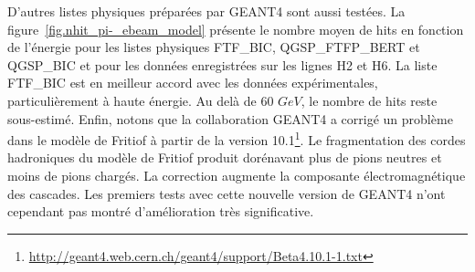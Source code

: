 D'autres listes physiques préparées par GEANT4 sont aussi testées. La figure~\ref{fig.nhit_pi-_ebeam_model} présente le nombre moyen de hits en fonction de l'énergie pour les listes physiques FTF\_BIC, QGSP\_FTFP\_BERT et QGSP\_BIC et pour les données enregistrées sur les lignes H2 et H6. La liste FTF\_BIC est en meilleur accord avec les données expérimentales, particulièrement à haute énergie. Au delà de 60 $GeV$, le nombre de hits reste sous-estimé. Enfin, notons que la collaboration GEANT4 a corrigé un problème dans le modèle de Fritiof à partir de la version 10.1\footnote{\url{http://geant4.web.cern.ch/geant4/support/Beta4.10.1-1.txt}}. Le fragmentation des cordes hadroniques du modèle de Fritiof produit dorénavant plus de pions neutres et moins de pions chargés. La correction augmente la composante électromagnétique des cascades. Les premiers tests avec cette nouvelle version de GEANT4 n'ont cependant pas montré d'amélioration très significative.

